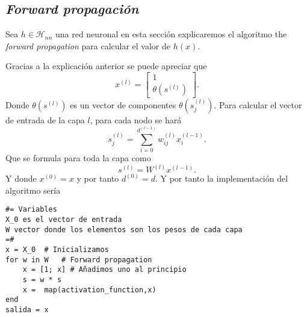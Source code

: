 \subsection{ \textit{Forward propagación}}
Sea $h \in \mathcal{H}_{n n}$ una red neuronal en esta sección explicaremos el algoritmo the \textit{forward propagation} para 
calcular el valor de $h(x).$

Gracias a la explicación anterior se puede apreciar que 
\begin{equation}
    x^{(l)} = 
    \left[ \begin{array}{c}
        1 \\
       \theta(s^{(l)})
        \end{array}
\right] .
\end{equation}
Donde $\theta(s^{(l)})$ es un vector de componentes $\theta(s^{(l)}_j)$. 
Para calcular el vector de entrada de la capa $l$, para cada nodo se hará
\begin{equation}
    s_j^{(l)} = \sum_{i=0}^{d^{(l-1)}} w_{i j}^{(l)}x_i^{(l-1)}.
\end{equation}
Que se formula para toda la capa como 
\begin{equation}
    s^{(l)} = W^{(l)} x^{(l-1)}.
\end{equation}
Y donde $x^{(0)} = x$ y por tanto $d^{(0)} = d.$
Y por tanto la implementación del algoritmo sería

\begin{verbatim}
#= Variables 
X_0 es el vector de entrada
W vector donde los elementos son los pesos de cada capa
=#
x = X_0  # Inicializamos 
for w in W   # Forward propagation
    x = [1; x] # Añadimos uno al principio
    s = w * s  
    x =  map(activation_function,x)
end
salida = x
\end{verbatim}

